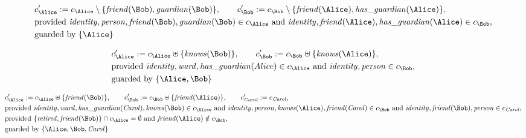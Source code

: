 \begin{align*}
&
c'_
{
\Alice
}
 := 
c_
{
\Alice
}
 \setminus 
\{
\mathit{\detokenize{
friend
}}
(
\Bob
)
,
\mathit{\detokenize{
guardian
}}
(
\Bob
)
\}
, \qquad 
c'_
{
\Bob
}
 := 
c_
{
\Bob
}
 \setminus 
\{
\mathit{\detokenize{
friend
}}
(
\Alice
)
,
\mathit{\detokenize{
has_guardian
}}
(
\Alice
)
\}
,\\
&
\text{provided } 
\mathit{\detokenize{
identity
}}
,
\mathit{\detokenize{
person
}}
,
\mathit{\detokenize{
friend
}}
(
\Bob
)
,
\mathit{\detokenize{
guardian
}}
(
\Bob
)
 \in c_
{
\Alice
}
 \text{ and } 
\mathit{\detokenize{
identity
}}
,
\mathit{\detokenize{
friend
}}
(
\Alice
)
,
\mathit{\detokenize{
has_guardian
}}
(
\Alice
)
 \in c_
{
\Bob
}
,\\
&
\text{guarded by } \{
\Alice
\}
\end{align*}

\begin{align*}
&
c'_
{
\Alice
}
 := 
c_
{
\Alice
}
 \uplus 
\{
\mathit{\detokenize{
knows
}}
(
\Bob
)
\}
, \qquad 
c'_
{
\Bob
}
 := 
c_
{
\Bob
}
 \uplus 
\{
\mathit{\detokenize{
knows
}}
(
\Alice
)
\}
,\\
&
\text{provided } 
\mathit{\detokenize{
identity
}}
,
\mathit{\detokenize{
ward
}}
,
\mathit{\detokenize{
has_guardian
}}
(
Alice
)
 \in c_
{
\Alice
}
 \text{ and } 
\mathit{\detokenize{
identity
}}
,
\mathit{\detokenize{
person
}}
 \in c_
{
\Bob
}
,\\
&
\text{guarded by } \{
\Alice
,
\Bob
\}
\end{align*}

\begin{align*}
&
c'_
{
\Alice
}
 := 
c_
{
\Alice
}
 \uplus 
\{
\mathit{\detokenize{
friend
}}
(
\Bob
)
\}
, \qquad 
c'_
{
\Bob
}
 := 
c_
{
\Bob
}
 \uplus 
\{
\mathit{\detokenize{
friend
}}
(
\Alice
)
\}
, \qquad 
c'_
{
\mathit{Carol}
}
 := 
c_
{
\mathit{Carol}
}
,\\
&
\text{provided } 
\mathit{\detokenize{
identity
}}
,
\mathit{\detokenize{
ward
}}
,
\mathit{\detokenize{
has_guardian
}}
(
\mathit{Carol}
)
,
\mathit{\detokenize{
knows
}}
(
\Bob
)
 \in c_
{
\Alice
}
 \text{ and } 
\mathit{\detokenize{
identity
}}
,
\mathit{\detokenize{
person
}}
,
\mathit{\detokenize{
knows
}}
(
\Alice
)
,
\mathit{\detokenize{
friend
}}
(
\mathit{Carol}
)
 \in c_
{
\Bob
}
 \text{ and } 
\mathit{\detokenize{
identity
}}
,
\mathit{\detokenize{
friend
}}
(
\Bob
)
,
\mathit{\detokenize{
person
}}
 \in c_
{
\mathit{Carol}
}
,\\
&
\text{provided } 
\{
\mathit{\detokenize{
retired
}}
,
\mathit{\detokenize{
friend
}}
(
\Bob
)
\}
 \cap c_
{
\Alice
}
 = \emptyset
 \text{ and } 
\mathit{\detokenize{
friend
}}
(
\Alice
)
 \notin c_
{
\Bob
}
,\\
&
\text{guarded by } \{
\Alice
,
\Bob
,
\mathit{Carol}
\}
\end{align*}
